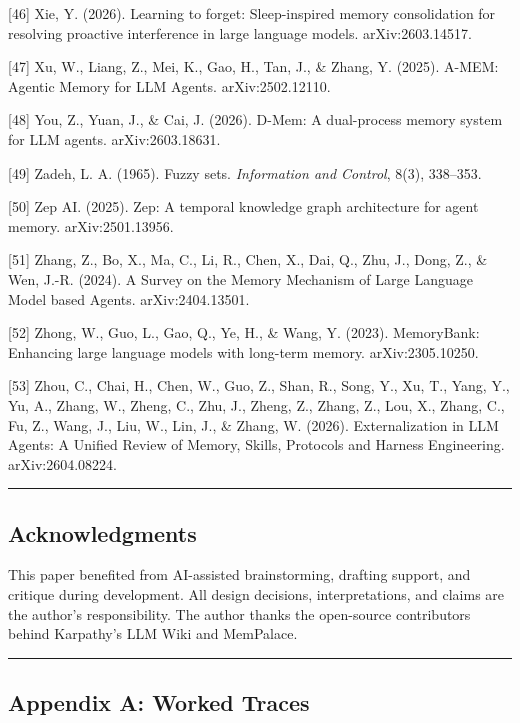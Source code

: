 \documentclass[
  11pt,
]{article}
\begin{document}
{[}46{]} Xie, Y. (2026). Learning to forget: Sleep-inspired memory
consolidation for resolving proactive interference in large language
models. arXiv:2603.14517.

{[}47{]} Xu, W., Liang, Z., Mei, K., Gao, H., Tan, J., \& Zhang, Y.
(2025). A-MEM: Agentic Memory for LLM Agents. arXiv:2502.12110.

{[}48{]} You, Z., Yuan, J., \& Cai, J. (2026). D-Mem: A dual-process
memory system for LLM agents. arXiv:2603.18631.

{[}49{]} Zadeh, L. A. (1965). Fuzzy sets. \emph{Information and
Control}, 8(3), 338--353.

{[}50{]} Zep AI. (2025). Zep: A temporal knowledge graph architecture
for agent memory. arXiv:2501.13956.

{[}51{]} Zhang, Z., Bo, X., Ma, C., Li, R., Chen, X., Dai, Q., Zhu, J.,
Dong, Z., \& Wen, J.-R. (2024). A Survey on the Memory Mechanism of
Large Language Model based Agents. arXiv:2404.13501.

{[}52{]} Zhong, W., Guo, L., Gao, Q., Ye, H., \& Wang, Y. (2023).
MemoryBank: Enhancing large language models with long-term memory.
arXiv:2305.10250.

{[}53{]} Zhou, C., Chai, H., Chen, W., Guo, Z., Shan, R., Song, Y., Xu,
T., Yang, Y., Yu, A., Zhang, W., Zheng, C., Zhu, J., Zheng, Z., Zhang,
Z., Lou, X., Zhang, C., Fu, Z., Wang, J., Liu, W., Lin, J., \& Zhang, W.
(2026). Externalization in LLM Agents: A Unified Review of Memory,
Skills, Protocols and Harness Engineering. arXiv:2604.08224.

\begin{center}\rule{0.5\linewidth}{0.5pt}\end{center}

\hypertarget{acknowledgments}{%
\subsection{Acknowledgments}\label{acknowledgments}}

This paper benefited from AI-assisted brainstorming, drafting support,
and critique during development. All design decisions, interpretations,
and claims are the author's responsibility. The author thanks the
open-source contributors behind Karpathy's LLM Wiki and MemPalace.

\begin{center}\rule{0.5\linewidth}{0.5pt}\end{center}

\hypertarget{appendix-a-worked-traces}{%
\subsection{Appendix A: Worked Traces}\label{appendix-a-worked-traces}}
\end{document}
